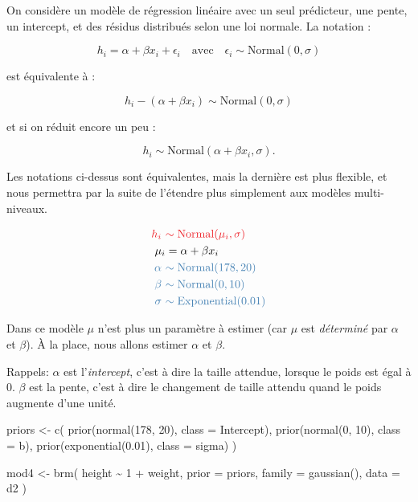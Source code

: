 \documentclass[
  a4paper,11pt,twoside,onecolumn,openright,final,oldfontcommands]{memoir}
\newenvironment{Shaded}{\begin{snugshade}}{\end{snugshade}}
\newcommand{\AttributeTok}[1]{\textcolor[rgb]{0.77,0.63,0.00}{#1}}
\newcommand{\DecValTok}[1]{\textcolor[rgb]{0.00,0.00,0.81}{#1}}
\newcommand{\FloatTok}[1]{\textcolor[rgb]{0.00,0.00,0.81}{#1}}
\newcommand{\FunctionTok}[1]{\textcolor[rgb]{0.00,0.00,0.00}{#1}}
\newcommand{\NormalTok}[1]{#1}
\newcommand{\OtherTok}[1]{\textcolor[rgb]{0.56,0.35,0.01}{#1}}
\newcommand{\SpecialCharTok}[1]{\textcolor[rgb]{0.00,0.00,0.00}{#1}}
\theoremstyle{definition}
\theoremstyle{definition}
\theoremstyle{definition}
\theoremstyle{definition}
\theoremstyle{remark}
\begin{document}
On considère un modèle de régression linéaire avec un seul prédicteur, une pente, un intercept, et des résidus distribués selon une loi normale. La notation :

\[
h_{i} = \alpha + \beta x_{i} + \epsilon_{i} \quad \text{avec} \quad \epsilon_{i} \sim \mathrm{Normal}(0, \sigma)
\]

est équivalente à :

\[
h_{i} - (\alpha + \beta x_{i}) \sim \mathrm{Normal}(0, \sigma)
\]

et si on réduit encore un peu :

\[
h_{i} \sim \mathrm{Normal}(\alpha + \beta x_{i}, \sigma).
\]

Les notations ci-dessus sont équivalentes, mais la dernière est plus flexible, et nous permettra par la suite de l'étendre plus simplement aux modèles multi-niveaux.

\[
\begin{aligned}
\color{orangered}{h_{i}} \ &\color{orangered}{\sim \mathrm{Normal}(\mu_{i},\sigma)} \\
\mu_{i} &= \alpha + \beta x_{i} \\
\color{steelblue}{\alpha} \ &\color{steelblue}{\sim \mathrm{Normal}(178, 20)} \\
\color{steelblue}{\beta} \ &\color{steelblue}{\sim \mathrm{Normal}(0, 10)} \\
\color{steelblue}{\sigma} \ &\color{steelblue}{\sim \mathrm{Exponential}(0.01)} \\
\end{aligned}
\]

Dans ce modèle \(\mu\) n'est plus un paramètre à estimer (car \(\mu\) est \emph{déterminé} par \(\alpha\) et \(\beta\)). À la place, nous allons estimer \(\alpha\) et \(\beta\).

Rappels: \(\alpha\) est l'\emph{intercept}, c'est à dire la taille attendue, lorsque le poids est égal à \(0\). \(\beta\) est la pente, c'est à dire le changement de taille attendu quand le poids augmente d'une unité.

\begin{Shaded}
\begin{Highlighting}[]
\NormalTok{priors }\OtherTok{\textless{}{-}} \FunctionTok{c}\NormalTok{(}
  \FunctionTok{prior}\NormalTok{(}\FunctionTok{normal}\NormalTok{(}\DecValTok{178}\NormalTok{, }\DecValTok{20}\NormalTok{), }\AttributeTok{class =}\NormalTok{ Intercept),}
  \FunctionTok{prior}\NormalTok{(}\FunctionTok{normal}\NormalTok{(}\DecValTok{0}\NormalTok{, }\DecValTok{10}\NormalTok{), }\AttributeTok{class =}\NormalTok{ b),}
  \FunctionTok{prior}\NormalTok{(}\FunctionTok{exponential}\NormalTok{(}\FloatTok{0.01}\NormalTok{), }\AttributeTok{class =}\NormalTok{ sigma)}
\NormalTok{  )}

\NormalTok{mod4 }\OtherTok{\textless{}{-}} \FunctionTok{brm}\NormalTok{(}
\NormalTok{  height }\SpecialCharTok{\textasciitilde{}} \DecValTok{1} \SpecialCharTok{+}\NormalTok{ weight,}
  \AttributeTok{prior =}\NormalTok{ priors,}
  \AttributeTok{family =} \FunctionTok{gaussian}\NormalTok{(),}
  \AttributeTok{data =}\NormalTok{ d2}
\NormalTok{  )}
\end{Highlighting}
\end{Shaded}
\end{document}
